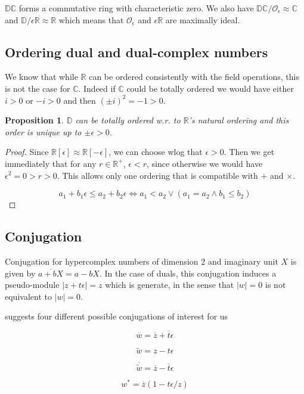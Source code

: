 \documentclass{article}
\newtheorem{proposition}[theorem]{Proposition}
\newcommand{\R}{\mathbb{R}}
\newcommand{\C}{\mathbb{C}}
\newcommand{\D}{\mathbb{D}}
\newcommand{\DC}{\mathbb{DC}}
\newcommand{\Z}{\mathcal{O}_\e}
\newcommand{\e}{\epsilon}
\newcommand{\til}{\widetilde}
\renewcommand{\bar}{\overline}
\begin{document}
$\DC$ forms a commutative ring with characteristic zero. We also have $\DC/\Z \approx \C$ and $\D/\e\R \approx \R$ which means that $\Z$ and $\e\R$ are maximally ideal.

\subsection{Ordering dual and dual-complex numbers}

We know that while $\R$ can be ordered consistently with the field operations, this is not the case for $\C$. Indeed if $\C$ could be totally ordered we would have either $i > 0$ or $-i > 0$ and then $(\pm i)^2 = -1 > 0$.

\begin{proposition}
 $\D$ can be totally ordered w.r. to $\R$'s natural ordering and this order is unique up to $\pm \e > 0$.
\end{proposition}
\begin{proof}
 Since $\R[\e] \approx \R[-\e]$, we can choose wlog that $\e > 0$. Then we get immediately that for any $r \in \R^+$, $\e < r$, since otherwise we would have $\e^2 = 0 > r > 0$. This allows only one ordering that is compatible with $+$ and $\times$.

\begin{equation}
a_1 + b_1 \e \leq a_2 + b_2 \e \iff a_1 < a_2 \lor (a_1 = a_2 \land b_1 \leq b_2)
\end{equation}
\end{proof}

\subsection{Conjugation}

\noindent Conjugation for hypercomplex numbers of dimension 2 and imaginary unit $X$ is given by $\bar{a + bX} = a - bX$. In the case of duals, this conjugation induces a pseudo-module $|z + t\e| = z$ which is generate, in the sense that $|w| = 0$ is not equivalent to $|w| = 0$.

\cite{messelmi2015} suggests four different possible conjugations of interest for us

\begin{multicols}{4}
\noindent \begin{equation}
\bar{w} = \bar{z} + \bar{t}\e
\end{equation}

\columnbreak

\noindent \begin{equation}
\til{w} = z - t\e
\end{equation}

\columnbreak

\noindent \begin{equation}
\bar{\til{w}} = \bar{z} - \bar{t}\e
\end{equation}

\columnbreak

\noindent \begin{equation}
w^* = \bar{z}(1-t\e/z)
\end{equation}
\end{multicols}
\end{document}
